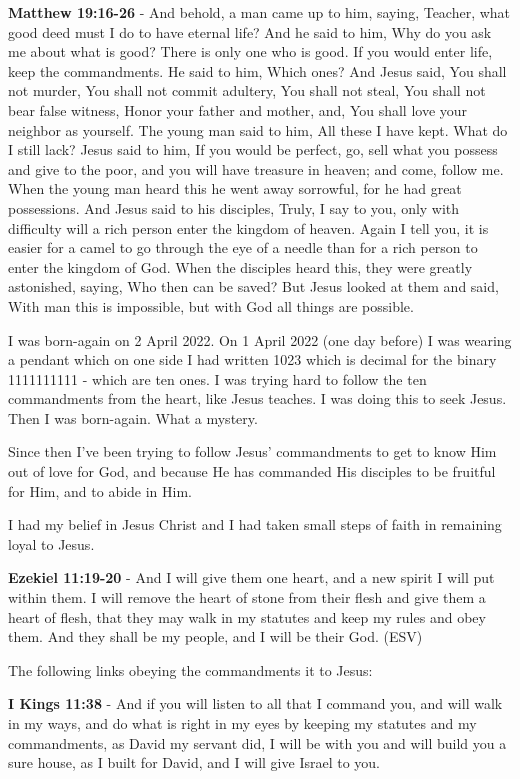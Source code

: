 \documentclass[11pt]{article}
\begin{document}
\textbf{Matthew 19:16-26} - And behold, a man came up to him, saying, Teacher, what good deed must I do to have eternal life? And he said to him, Why do you ask me about what is good? There is only one who is good. If you would enter life, keep the commandments. He said to him, Which ones? And Jesus said, You shall not murder, You shall not commit adultery, You shall not steal, You shall not bear false witness, Honor your father and mother, and, You shall love your neighbor as yourself. The young man said to him, All these I have kept. What do I still lack? Jesus said to him, If you would be perfect, go, sell what you possess and give to the poor, and you will have treasure in heaven; and come, follow me. When the young man heard this he went away sorrowful, for he had great possessions. And Jesus said to his disciples, Truly, I say to you, only with difficulty will a rich person enter the kingdom of heaven. Again I tell you, it is easier for a camel to go through the eye of a needle than for a rich person to enter the kingdom of God. When the disciples heard this, they were greatly astonished, saying, Who then can be saved? But Jesus looked at them and said, With man this is impossible, but with God all things are possible.

I was born-again on 2 April 2022. On 1 April 2022 (one day before) I was wearing a pendant which on one side I had written 1023 which is decimal for the binary 1111111111 - which are ten ones. I was trying hard to follow the ten commandments from the heart, like Jesus teaches. I was doing this to seek Jesus. Then I was born-again. What a mystery.

Since then I've been trying to follow Jesus' commandments to get to know Him out of love for God, and because He has commanded His disciples to be fruitful for Him, and to abide in Him.

I had my belief in Jesus Christ and I had taken small steps of faith in remaining loyal to Jesus.

\textbf{Ezekiel 11:19-20} - And I will give them one heart, and a new spirit I will put within them. I will remove the heart of stone from their flesh and give them a heart of flesh, that they may walk in my statutes and keep my rules and obey them. And they shall be my people, and I will be their God. (ESV)

The following links obeying the commandments it to Jesus:

\textbf{I Kings 11:38} - And if you will listen to all that I command you, and will walk in my ways, and do what is right in my eyes by keeping my statutes and my commandments, as David my servant did, I will be with you and will build you a sure house, as I built for David, and I will give Israel to you.
\end{document}
